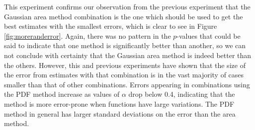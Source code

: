 \documentclass[a4paper,11pt]{article}
\begin{document}
    This experiment confirms our observation from the previous experiment that the
    Gaussian area method combination is the one which should be used to get the best
    estimates with the smallest errors, which is clear to see in Figure
    \ref{fig:moreranderror}. Again, there was no pattern in the $p$-values that
    could be said to indicate that one method is significantly better than another,
    so we can not conclude with certainty that the Gaussian area method is indeed
    better than the others. However, this and previous experiments have shown that
    the size of the error from estimates with that combination is in the vast
    majority of cases smaller than that of other combinations. Errors appearing in
    combinations using the PDF method increase as values of $\alpha$ drop below 0.4,
    indicating that the method is more error-prone when functions have large
    variations. The PDF method in general has larger standard deviations on the
    error than the area method.
\end{document}
